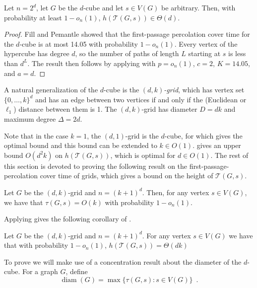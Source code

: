 \documentclass{patmorin}
\DeclareMathOperator{\diam}{diam}
\newcommand{\tcal}{\mathcal{T}}
\begin{document}
\begin{thm}
  Let $n=2^d$, let $G$ be the $d$-cube and let $s\in V(G)$ be arbitrary. Then,
  with probability at least $1-o_n(1)$, $h(\tcal(G,s))\in \Theta(d)$.
\end{thm}

\begin{proof}
  Fill and Pemantle \cite{fill.pemantle:percolation} showed that the
  first-passage percolation cover time for the $d$-cube is at most 14.05
  with probability $1-o_n(1)$.  Every vertex of the hypercube has degree
  $d$, so the number of paths of length $L$ starting at $s$ is less
  than $d^L$.  The result then follows by applying 
  with $p=o_n(1)$, $c=2$, $K=14.05$, and $a=d$.
\end{proof}

A natural generalization of the $d$-cube is the \emph{$(d,k)$-grid}, which
has vertex set $\{0,\ldots,k\}^d$ and has an edge between two vertices
if and only if the (Euclidean or $\ell_1$) distance between them is 1.
The $(d,k)$-grid has diameter $D=dk$ and maximum degree $\Delta=2d$.

Note that in the case $k=1$, the $(d,1)$-grid is the $d$-cube, for which
 gives the optimal bound and this
bound can be extended to $k\in O(1)$.   
gives an upper bound $O(d^2k)$ on $h(\tcal(G,s))$, which is optimal
for $d\in O(1)$.  The rest of this section is devoted to proving the
following result on the first-passage-percolation cover time of grids,
which gives a bound on the height of $\tcal(G,s)$.

\begin{thm}
Let $G$ be the $(d,k)$-grid and $n=(k+1)^d$.  Then, for any vertex $s\in
V(G)$, we have that $\tau(G,s)= O(k)$ with probability $1-o_n(1)$.
\end{thm}

Applying  gives the following corollary of
.

\begin{cor}
Let $G$ be the $(d,k)$-grid and $n=(k+1)^d$.  For any vertex $s\in V(G)$
we have that with probability $1-o_n(1)$, $ h(\tcal(G,s)) = \Theta(dk)$
\end{cor}

To prove  we will make use of a concentration
result about the diameter of the $d$-cube.  For a graph $G$, define
\[
    \diam(G) = \max\{\tau(G,s) : s\in V(G)\} \enspace .
\]
\end{document}
